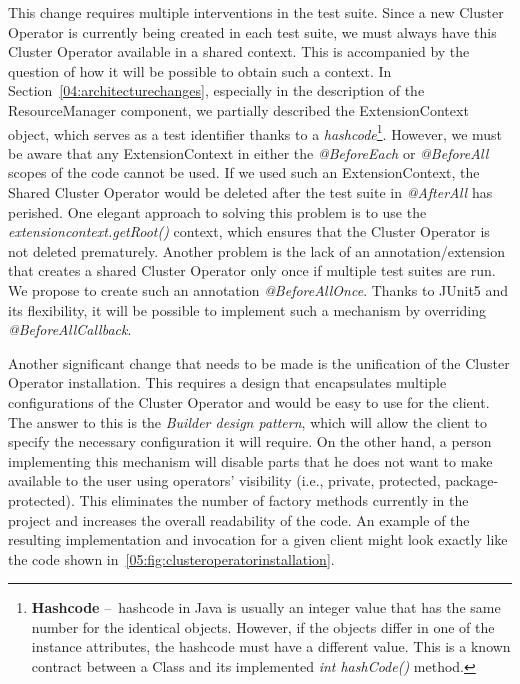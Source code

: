 This change requires multiple interventions in the test suite.
Since a new Cluster Operator is currently being created in each test suite, we must always have this Cluster Operator available in a shared context.
This is accompanied by the question of how it will be possible to obtain such a context.
In Section~\ref{04:architecturechanges}, especially in the description of the ResourceManager component, we partially described the ExtensionContext object,
which serves as a test identifier thanks to a \emph{hashcode}\footnote{\textbf{Hashcode} \---\ hashcode in Java is usually an integer value that has the same number
for the identical objects. However, if the objects differ in one of the instance attributes, the hashcode must have a different value. This is a known contract between
a Class and its implemented \emph{int hashCode()} method.}.
However, we must be aware that any ExtensionContext in either the \emph{@BeforeEach} or \emph{@BeforeAll} scopes of the code cannot be used.
If we used such an ExtensionContext, the Shared Cluster Operator would be deleted after the test suite in \emph{@AfterAll} has perished.
One elegant approach to solving this problem is to use the \emph{extensioncontext.getRoot()} context, which ensures that the Cluster Operator is not deleted prematurely.
Another problem is the lack of an annotation/extension that creates a shared Cluster Operator only once if multiple test suites are run.
We propose to create such an annotation \emph{@BeforeAllOnce}.
Thanks to JUnit5 and its flexibility, it will be possible to implement such a mechanism by overriding \emph{@BeforeAllCallback}.

Another significant change that needs to be made is the unification of the Cluster Operator installation.
This requires a design that encapsulates multiple configurations of the Cluster Operator and would be easy to use for the client.
The answer to this is the \emph{Builder design pattern}, which will allow the client to specify the necessary configuration it will require.
On the other hand, a person implementing this mechanism will disable parts that he does not want to make available to the user using operators' visibility (i.e., private, protected, package-protected).
This eliminates the number of factory methods currently in the project and increases the overall readability of the code.
An example of the resulting implementation and invocation for a given client might look exactly like the code shown in~\ref{05:fig:clusteroperatorinstallation}.

